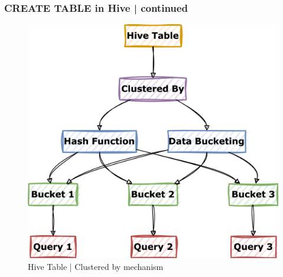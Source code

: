 \begin{frame}
	\frametitle{CREATE TABLE in Hive | continued}		
	\vspace{-0.5cm}
	\begin{tcolorbox}[colback=white,colframe=black,title= Part 6: Clustering and Sorting | CLUSTERED BY]
		\vspace{-0.2cm}
		\begin{figure}
			\includegraphics[width=\textwidth,height=.65\textheight,keepaspectratio]{./Figures/chapter-03/mermaid-diagram-hive_db_clustered_by.png}				
			\caption{Hive Table | Clustered by mechanism}	
		\end{figure}
	\end{tcolorbox}				
\end{frame}
